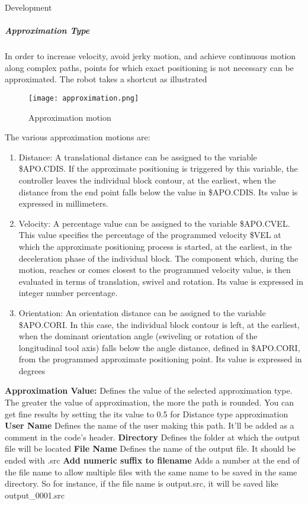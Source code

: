 \documentclass[a4paper]{book}
\begin{document}
\begin{chapter}{Development}
\subparagraph{Approximation Type}
In order to increase velocity, avoid jerky motion, and achieve continuous motion along complex paths, points for which exact positioning is not necessary can be approximated. The robot takes a shortcut as illustrated 
\begin{figure}[H]
	\centering
	\caption{Approximation motion}
	\texttt{[image: approximation.png]}
\end{figure}
The various approximation motions are:
\begin{enumerate}
	\item Distance: A translational distance can be assigned to the variable \$APO.CDIS. If the approximate positioning is triggered by this variable, the controller leaves the individual block contour, at the earliest, when the distance from the end point falls below the value in \$APO.CDIS. Its value is expressed in millimeters.
	\item Velocity: A percentage value can be assigned to the variable \$APO.CVEL. This value specifies the percentage of the programmed velocity \$VEL at which the approximate positioning process is started, at the earliest, in the deceleration phase of the individual block. The component which, during the motion, reaches or comes closest to the programmed velocity value, is then evaluated in terms of translation, swivel and rotation. Its value is expressed in integer number percentage.
	\item Orientation: An orientation distance can be assigned to the variable \$APO.CORI. In this case, the individual block contour is left, at the earliest, when the dominant orientation angle (swiveling or rotation of the longitudinal tool axis) falls below the angle distance, defined in \$APO.CORI, from the programmed approximate positioning point. Its value is expressed in degrees
\end{enumerate}
\textbf{Approximation Value:}
\newline
Defines the value of the selected approximation type. The greater the value of approximation, the more the path is rounded. You can get fine results by setting the its value to 0.5 for Distance type approximation
\textbf{User Name}
\newline 
Defines the name of the user making this path. It'll be added as a comment in the code's header.
\textbf{Directory}
\newline Defines the folder at which the output file will be located
\textbf{File Name}
\newline Defines the name of the output file. It should be ended with .src
\textbf{Add numeric suffix to filename}
\newline Adds a number at the end of the file name to allow multiple files with the same name to be saved in the same directory. So for instance, if the file name is output.src, it will be saved like output\_0001.src

\end{chapter}
\end{document}
